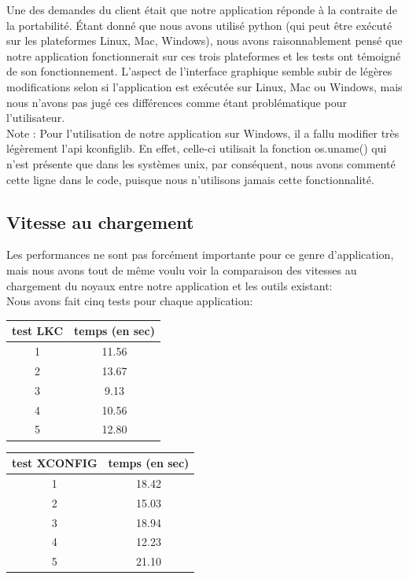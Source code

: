 \documentclass[16pts]{report}
\begin{document}
Une des demandes du client était que notre application réponde à la contraite
de la portabilité. Étant donné que nous avons utilisé python (qui peut être
exécuté sur les plateformes Linux, Mac, Windows), nous avons raisonnablement
pensé que notre application fonctionnerait sur ces trois plateformes et les
tests ont témoigné de son fonctionnement. L'aspect de l'interface graphique
semble subir de légères modifications selon si l'application est exécutée sur
Linux, Mac ou Windows, mais nous n'avons pas jugé ces différences comme étant
problématique pour l'utilisateur.\\

Note : Pour l'utilisation de notre application sur Windows, il a fallu modifier
très légèrement l'api kconfiglib. En effet, celle-ci utilisait la fonction
os.uname() qui n'est présente que dans les systèmes unix, par conséquent, nous
avons commenté cette ligne dans le code, puisque nous n'utilisons jamais cette
fonctionnalité.

\subsection{Vitesse au chargement}

Les performances ne sont pas forcément importante pour ce genre d'application,
mais nous avons tout de même voulu voir la comparaison des vitesses au
chargement du noyaux entre notre application et les outils existant:\\

Nous avons fait cinq tests pour chaque application:\\


\begin{tabular}{|c|c|}
\hline
test LKC & temps (en sec) \\
\hline
\hline
1 & 11.56 \\
\hline
2 & 13.67 \\
\hline
3 & 9.13 \\
\hline
4 & 10.56 \\
\hline
5 & 12.80 \\
\hline
\end{tabular}
\newline
\newline

\begin{tabular}{|c|c|}
\hline
test XCONFIG & temps (en sec) \\
\hline
\hline
1 & 18.42 \\
\hline
2 & 15.03 \\
\hline
3 & 18.94 \\
\hline
4 & 12.23 \\
\hline
5 & 21.10 \\
\hline
\end{tabular}
\newline
\newline
\end{document}
